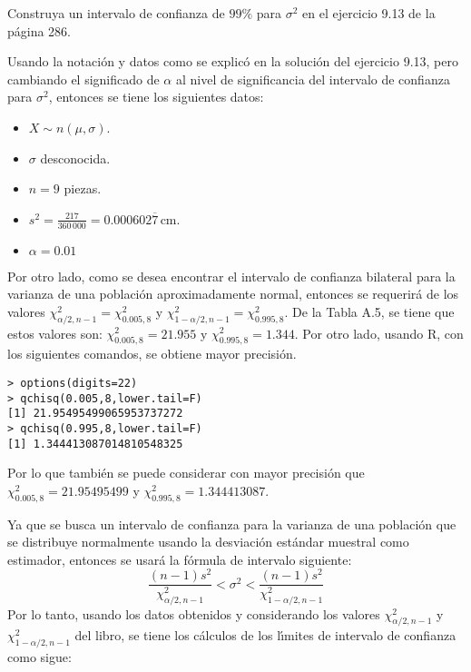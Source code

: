 \begin{enunciado}
 Construya un intervalo de confianza de $99\%$ para $\sigma^2$ en el ejercicio 9.13 de la p\'agina 286.
\end{enunciado}

\begin{solucion}
 Usando la notaci\'on y datos como se explic\'o en la soluci\'on del ejercicio 9.13, pero cambiando el significado de $\alpha$ al nivel de significancia del intervalo de confianza para $\sigma^2$, entonces se tiene los siguientes datos:
 \begin{itemize}
  \item $X \sim n(\mu, \sigma)$.
  \item $\sigma$ desconocida.
  \item $n = 9$ piezas.
  \item $s^2 = \frac{217}{360\,000} = 0.000602\overline{7}\,$cm.
  \item $\alpha = 0.01$
 \end{itemize}
 Por otro lado, como se desea encontrar el intervalo de confianza bilateral para la varianza de una poblaci\'on aproximadamente normal, entonces se requerir\'a de los valores $\chi^2_{\alpha/2,n-1} = \chi^2_{0.005,8}$ y $\chi^2_{1-\alpha/2,n-1} = \chi^2_{0.995,8}$. De la Tabla A.5, se tiene que estos valores son: $\chi^2_{0.005,8} = 21.955$ y $\chi^2_{0.995,8} = 1.344$. Por otro lado, usando R, con los siguientes comandos, se obtiene mayor precisi\'on.
 \begin{verbatim}
> options(digits=22)
> qchisq(0.005,8,lower.tail=F)
[1] 21.95495499065953737272
> qchisq(0.995,8,lower.tail=F)
[1] 1.344413087014810548325
 \end{verbatim}
 \vspace{-0.5cm}
 Por lo que tambi\'en se puede considerar con mayor precisi\'on que $\chi^2_{0.005,8} = 21.95495499$ y $\chi^2_{0.995,8} = 1.344413087$.
 \par 
 Ya que se busca un intervalo de confianza para la varianza de una poblaci\'on que se distribuye normalmente usando la desviaci\'on est\'andar muestral como estimador, entonces se usar\'a la f\'ormula de intervalo siguiente:
 \begin{equation*}
  \frac{(n-1)s^2}{\chi^2_{\alpha/2,n-1}} < \sigma^2 < \frac{(n-1)s^2}{\chi^2_{1-\alpha/2,n-1}}
 \end{equation*}
 Por lo tanto, usando los datos obtenidos y considerando los valores $\chi^2_{\alpha/2,n-1}$ y $\chi^2_{1-\alpha/2,n-1}$ del libro, se tiene los c\'alculos de los l\'{\i}mites de intervalo de confianza como sigue:

\end{solucion}
